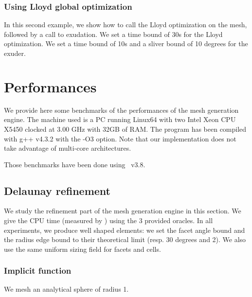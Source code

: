

\subsubsection{Using Lloyd global optimization}

In this second example, we show how to call  the Lloyd optimization on the
mesh, followed by a call to exudation. We set a time bound of 30s for the Lloyd optimization. 
We set a time bound of 10s and a sliver bound of 10 degrees for the exuder.






\section{Performances}

We provide here some benchmarks of the performances of the mesh generation engine. The machine
used is a PC running Linux64 with two Intel Xeon CPU X5450 clocked at 3.00 GHz
with 32GB of RAM. The program has been compiled with g++ v4.3.2 with the -O3 option. 
Note that our implementation does not take advantage of multi-core
architectures.

Those benchmarks have been done using \cgal\ v3.8.

\subsection{Delaunay refinement}

We study the refinement part of the mesh generation engine in this section. We
give the CPU time (measured by ) using the 3 provided oracles. In all experiments, we produce well
shaped elements: we set the facet angle bound and the radius edge bound to their
theoretical limit (resp. 30 degrees and 2). We also use the same uniform sizing field for facets
and cells.

\subsubsection{Implicit function}

We mesh an analytical sphere of radius 1.

